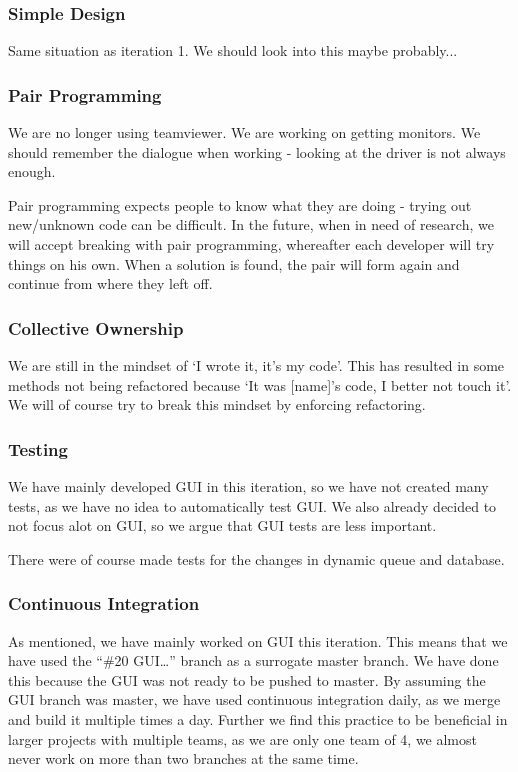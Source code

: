 \subsubsection{Simple Design}
Same situation as iteration 1. We should look into this maybe probably...

\subsubsection{Pair Programming}
We are no longer using teamviewer. We are working on getting monitors.
We should remember the dialogue when working - looking at the driver is not always enough.

Pair programming expects people to know what they are doing - trying out new/unknown code can be difficult. In the future, when in need of research, we will accept breaking with pair programming, whereafter each developer will try things on his own. When a solution is found, the pair will form again and continue from where they left off.

\subsubsection{Collective Ownership}
We are still in the mindset of `I wrote it, it’s my code'. This has resulted in some methods not being refactored because `It was [name]’s code, I better not touch it'. We will of course try to break this mindset by enforcing refactoring.

\subsubsection{Testing}
We have mainly developed GUI in this iteration, so we have not created many tests, as we have no idea to automatically test GUI. We also already decided to not focus alot on GUI, so we argue that GUI tests are less important.

There were of course made tests for the changes in dynamic queue and database.

\subsubsection{Continuous Integration}
As mentioned, we have mainly worked on GUI this iteration. This means that we have used the ``\#20 GUI…'' branch as a surrogate master branch. We have done this because the GUI was not ready to be pushed to master. By assuming the GUI branch was master, we have used continuous integration daily, as we merge and build it multiple times a day.
Further we find this practice to be beneficial in larger projects with multiple teams, as we are only one team of 4, we almost never work on more than two branches at the same time. 
